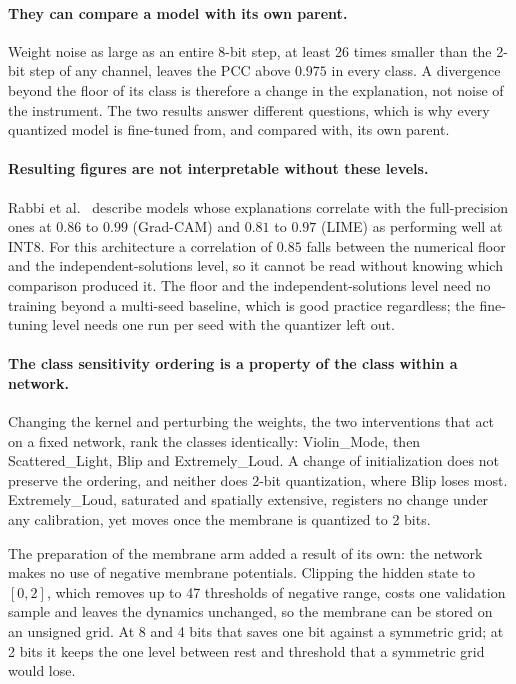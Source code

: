 \paragraph{They can compare a model with its own parent.} Weight noise as large
as an entire 8-bit step, at least 26 times smaller than the 2-bit step of any
channel, leaves the PCC above $0.975$ in every class. A divergence beyond the
floor of its class is therefore a change in the explanation, not noise of the
instrument. The two results answer different questions, which is why every
quantized model is fine-tuned from, and compared with, its own parent.

\paragraph{Resulting figures are not interpretable without these levels.} Rabbi
et al.~\cite{rabbi2026} describe models whose explanations correlate with the
full-precision ones at $0.86$ to $0.99$ (Grad-CAM) and $0.81$ to $0.97$ (LIME) as
performing well at INT8. For this architecture a correlation of
$0.85$ falls between the numerical floor and the independent-solutions level, so
it cannot be read without knowing which comparison produced it.
The floor and the independent-solutions level need no
training beyond a multi-seed baseline, which is good practice regardless; the
fine-tuning level needs one run per seed with the quantizer left out.

\paragraph{The class sensitivity ordering is a property of the class within a
network.} Changing the kernel and perturbing the weights, the two interventions
that act on a fixed network, rank the classes identically: Violin\_Mode, then
Scattered\_Light, Blip and Extremely\_Loud. A change of initialization does not
preserve the ordering, and neither does 2-bit quantization, where Blip loses
most. Extremely\_Loud, saturated and spatially extensive, registers no change
under any calibration, yet moves once the membrane is quantized to 2 bits.

The preparation of the membrane arm added a result of its own: the network makes
no use of negative membrane potentials. Clipping the hidden state to $[0, 2]$,
which removes up to 47 thresholds of negative range, costs one validation sample
and leaves the dynamics unchanged, so the membrane can be stored on an unsigned
grid. At 8 and 4 bits that saves one bit against a symmetric grid; at 2 bits it
keeps the one level between rest and threshold that a symmetric grid would lose.

